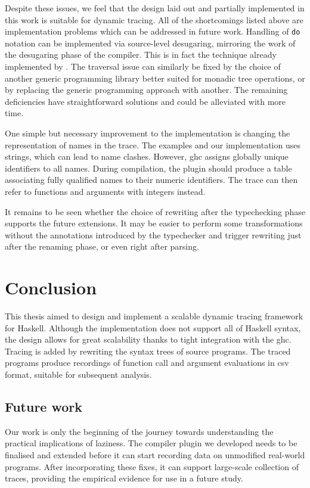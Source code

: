 \documentclass[thesis=B,english]{FITthesis}[2019/12/23]
\newcommand{\hsCode}[1]{\texttt{#1}}
\begin{document}
Despite these issues, we feel that the design laid out and partially
implemented in this work is suitable for dynamic tracing. All of the
shortcomings listed above are implementation problems which can be addressed in
future work. Handling of \hsCode{do} notation can be implemented via
source-level desugaring, mirroring the work of the desugaring phase of the
compiler. This is in fact the technique already implemented by
. The traversal issue can similarly be fixed by the choice of
another generic programming library better suited for monadic tree operations,
or by replacing the generic programming approach with another. The remaining
deficiencies have straightforward solutions and could be alleviated with more
time.

One simple but necessary improvement to the implementation is changing the
representation of names in the trace. The examples and our implementation uses
strings, which can lead to name clashes. However, \acrshort{ghc} assigns
globally unique identifiers to all names. During compilation, the plugin should
produce a table associating fully qualified names to their numeric identifiers.
The trace can then refer to functions and arguments with integers instead.

It remains to be seen whether the choice of rewriting after the typechecking
phase supports the future extensions. It may be easier to perform some
transformations without the annotations introduced by the typechecker and
trigger rewriting just after the renaming phase, or even right after parsing.


\chapter{Conclusion}

This thesis aimed to design and implement a scalable dynamic tracing framework
for Haskell. Although the implementation does not support all of Haskell
syntax, the design allows for great scalability thanks to tight integration
with the \acrlong{ghc}. Tracing is added by rewriting the syntax trees of
source programs. The traced programs produce recordings of function call and
argument evaluations in \acrshort{csv} format, suitable for subsequent
analysis.

\section*{Future work}
Our work is only the beginning of the journey towards understanding the
practical implications of laziness. The compiler plugin we developed needs to
be finalised and extended before it can start recording data on unmodified
real-world programs. After incorporating these fixes, it can support
large-scale collection of traces, providing the empirical evidence for use in a
future study.
\end{document}
